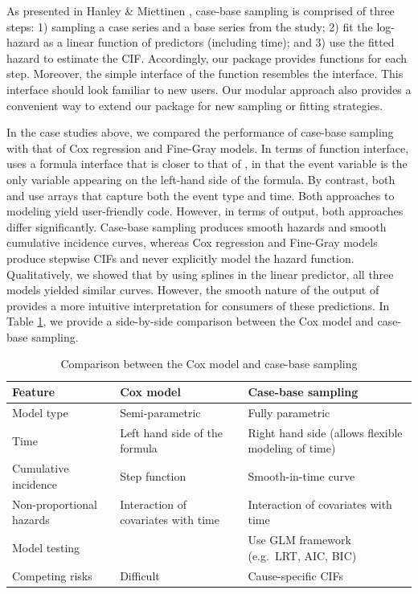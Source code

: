 \documentclass[
]{jss}
\begin{document}
As presented in Hanley \& Miettinen \citeyearpar{hanley2009fitting},
case-base sampling is comprised of three steps: 1) sampling a case
series and a base series from the study; 2) fit the log-hazard as a
linear function of predictors (including time); and 3) use the fitted
hazard to estimate the CIF. Accordingly, our package provides functions
for each step. Moreover, the simple interface of the
 function resembles the  interface.
This interface should look familiar to new users. Our modular approach
also provides a convenient way to extend our package for new sampling or
fitting strategies.

In the case studies above, we compared the performance of case-base
sampling with that of Cox regression and Fine-Gray models. In terms of
function interface,  uses a formula interface that is
closer to that of , in that the event variable is the only
variable appearing on the left-hand side of the formula. By contrast,
both  and  use arrays
that capture both the event type and time. Both approaches to modeling
yield user-friendly code. However, in terms of output, both approaches
differ significantly. Case-base sampling produces smooth hazards and
smooth cumulative incidence curves, whereas Cox regression and Fine-Gray
models produce stepwise CIFs and never explicitly model the hazard
function. Qualitatively, we showed that by using splines in the linear
predictor, all three models yielded similar curves. However, the smooth
nature of the output of  provides a more intuitive
interpretation for consumers of these predictions. In Table
\ref{tab:compCBvsCox}, we provide a side-by-side comparison between the
Cox model and case-base sampling.

\begin{table}
\caption{\label{tab:compCBvsCox}Comparison between the Cox model and case-base sampling}
\centering
\begin{tabular}[t]{llp{5cm}}
\toprule
Feature & Cox model & Case-base sampling\\
\midrule
Model type & Semi-parametric & Fully parametric\\
Time & Left hand side of the formula & Right hand side (allows flexible modeling of time)\\
Cumulative incidence & Step function & Smooth-in-time curve\\
Non-proportional hazards & Interaction of covariates with time & Interaction of covariates with time\\
Model testing &  & Use GLM framework \newline (e.g.\ LRT, AIC, BIC)\\
\addlinespace
Competing risks & Difficult & Cause-specific CIFs\\
\bottomrule
\end{tabular}
\end{table}
\end{document}
